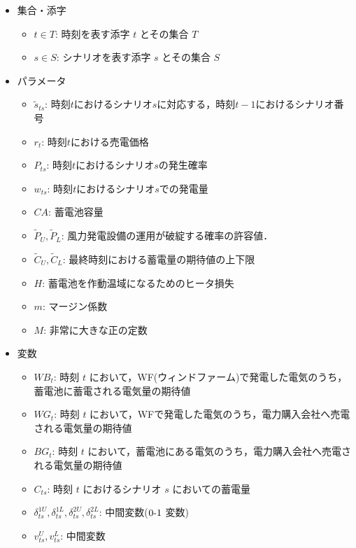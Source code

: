 \documentclass[a4paper,10pt]{jarticle}
\begin{document}
\begin{spacing}{0.9}
\begin{itemize}
\item 集合・添字

\begin{itemize}
\item $t \in T$: 時刻を表す添字 $t$ とその集合 $T$
\item $s \in S$: シナリオを表す添字 $s$ とその集合 $S$
\end{itemize}

\item パラメータ
\begin{itemize}
\item $\tilde{s}_{ts}$: 時刻$t$におけるシナリオ$s$に対応する，時刻$t-1$におけるシナリオ番号
\item $r_t$: 時刻$t$における売電価格
\item $P_{ts}$: 時刻$t$におけるシナリオ$s$の発生確率
\item $w_{ts}$: 時刻$t$におけるシナリオ$s$での発電量
\item $CA$: 蓄電池容量
\item $\tilde{P}_U, \tilde{P}_L$: 風力発電設備の運用が破綻する確率の許容値．
\item $\tilde{C}_U, \tilde{C}_L$: 最終時刻における蓄電量の期待値の上下限
\item $H$: 蓄電池を作動温域になるためのヒータ損失
\item $m$: マージン係数
\item $M$: 非常に大きな正の定数
\end{itemize}
\item 変数
\begin{itemize}
\item $WB_t$: 時刻 $t$ において，WF(ウィンドファーム)で発電した電気のうち，蓄電池に蓄電される電気量の期待値
\item $WG_t$: 時刻 $t$ において，WFで発電した電気のうち，電力購入会社へ売電される電気量の期待値
\item $BG_t$: 時刻 $t$ において，蓄電池にある電気のうち，電力購入会社へ売電される電気量の期待値
\item $C_{ts}$: 時刻 $t$ におけるシナリオ $s$ においての蓄電量
\item $\delta^{1U}_{ts}, \delta^{1L}_{ts}, \delta^{2U}_{ts}, \delta^{2L}_{ts}$: 中間変数($0\mathchar`-1$ 変数)
\item $v^U_{ts}, v^L_{ts}$: 中間変数
\end{itemize}
\end{itemize}
\end{spacing}
\vspace{-6mm}
\end{document}
